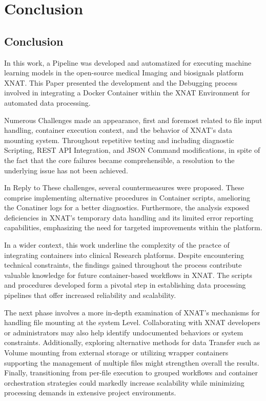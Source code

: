 \chapter{Conclusion}


\section{Conclusion}
In this work, a Pipeline was developed and automatized for executing machine learning models in the open-source medical Imaging and biosignals platform XNAT. This Paper presented the development and the Debugging process involved in integrating a Docker Container within the XNAT Environment for automated data processing.

Numerous Challenges made an appearance, first and foremost related to file input handling, container execution context, and the behavior of XNAT's data mounting system. Throughout repetitive testing and including diagnostic Scripting, REST API Integration, and JSON Command modifications, in spite of the fact that the core failures became comprehensible, a resolution to the underlying issue has not been achieved.


In Reply to These challenges, several countermeasures were proposed. These comprise implementing alternative procedures in Container scripts, amelioring the Conatiner logs for a better diagnostics. Furthermore, the analysis exposed deficiencies in XNAT’s temporary data handling and its limited error reporting capabilities, emphasizing the need for targeted improvements within the platform.

In a wider context, this work underline the complexity of the practce of integrating containers into clinical Research platforms.
Despite encountering technical constraints, the findings gained throughout the process
contribute valuable knowledge for future container-based workflows in XNAT. The scripts and procedures developed form a pivotal step in establishing data processing pipelines that offer increased reliability and scalability.

The next phase involves a more in-depth examination of XNAT's mechanisms for handling file mounting at the system Level. Collaborating with XNAT developers or administrators may also help identify undocumented behaviors or system constraints. Additionally, exploring alternative methods for data Transfer such as Volume mounting from external storage or utilizing wrapper containers supporting the management of multiple files  might strengthen overall the results. Finally, transitioning from per-file execution to grouped workflows and container orchestration strategies could markedly increase scalability while minimizing processing demands in extensive project environments.


